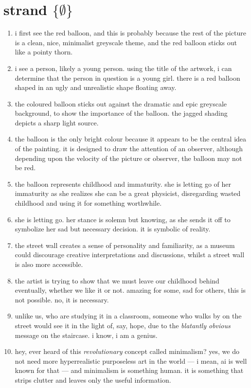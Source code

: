\documentclass{article}
\begin{document}
  \section{strand \( \{ \emptyset \} \)}
  \begin{enumerate}
      \item i first see the red balloon, and this is probably because the rest of the picture is a clean, nice, minimalist greyscale theme, and the red balloon sticks out like a pointy thorn.
      \item i see a person, likely a young person. using the title of the artwork, i can determine that the person in question is a young girl. there is a red balloon shaped in an ugly and unrealistic shape floating away.
      \item the coloured balloon sticks out against the dramatic and epic greyscale background, to show the importance of the balloon. the jagged shading depicts a sharp light source.
      \item the balloon is the only bright colour because it appears to be the central idea of the painting. it is designed to draw the attention of an observer, although depending upon the velocity of the picture or observer, the balloon may not be red.
      \item the balloon represents childhood and immaturity. she is letting go of her immaturity as she realizes she can be a great physicist, disregarding wasted childhood and using it for something worthwhile. %
      \item she is letting go. her stance is solemn but knowing, as she sends it off to symbolize her sad but necessary decision. it is symbolic of reality.
      \item the street wall creates a sense of personality and familiarity, as a museum could discourage creative interpretations and discussions, whilst a street wall is also more accessible.
      \item the artist is trying to show that we must leave our childhood behind eventually, whether we like it or not. amazing for some, sad for others, this is not possible. no, it is necessary.
      \item unlike us, who are studying it in a classroom, %
        someone who walks by on the street would see it in the light of, say, hope, due to the \emph{blatantly obvious} message on the staircase. i know, i am a genius. %
      \item hey, ever heard of this \emph{revolutionary} concept called minimalism? yes, we do not need more hyperrealistic purposeless art in the world --- i mean, ai is well known for that --- and minimalism is something human. it is something that strips clutter and leaves only the useful information. 
  \end{enumerate}
\end{document}
